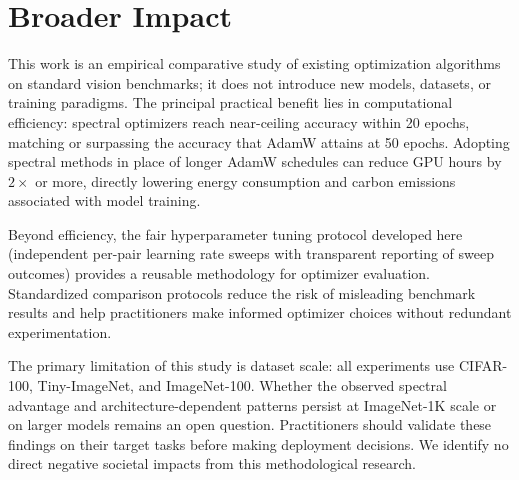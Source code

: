 \section*{Broader Impact}

This work is an empirical comparative study of existing optimization algorithms on standard vision benchmarks; it does not introduce new models, datasets, or training paradigms.
The principal practical benefit lies in computational efficiency: spectral optimizers reach near-ceiling accuracy within 20 epochs, matching or surpassing the accuracy that AdamW attains at 50 epochs.
Adopting spectral methods in place of longer AdamW schedules can reduce GPU hours by $2\times$ or more, directly lowering energy consumption and carbon emissions associated with model training.

Beyond efficiency, the fair hyperparameter tuning protocol developed here (independent per-pair learning rate sweeps with transparent reporting of sweep outcomes) provides a reusable methodology for optimizer evaluation.
Standardized comparison protocols reduce the risk of misleading benchmark results and help practitioners make informed optimizer choices without redundant experimentation.

The primary limitation of this study is dataset scale: all experiments use CIFAR-100, Tiny-ImageNet, and ImageNet-100.
Whether the observed spectral advantage and architecture-dependent patterns persist at ImageNet-1K scale or on larger models remains an open question.
Practitioners should validate these findings on their target tasks before making deployment decisions.
We identify no direct negative societal impacts from this methodological research.
